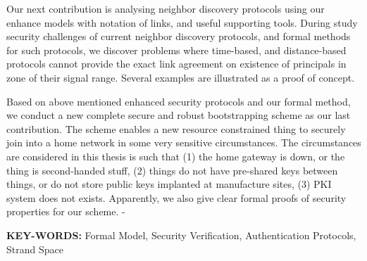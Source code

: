 \documentclass[11pt,a4paper]{book}
\begin{document}
Our next contribution is analysing neighbor discovery protocols using our enhance models with notation of links, and useful supporting tools. During study security challenges of current neighbor discovery protocols, and formal methods for such protocols, we discover problems where time-based, and distance-based protocols cannot provide the exact link agreement on existence of principals in zone of their signal range. Several examples are illustrated as a proof of concept.

Based on above mentioned enhanced security protocols and our formal method, we conduct a new complete secure and robust bootstrapping scheme as our last contribution. The scheme enables a new resource constrained thing to securely join into a home network in some very sensitive circumstances. The circumstances are considered in this thesis is such that (1) the home gateway is down, or the thing is second-handed stuff, (2) things do not have pre-shared keys between things, or do not store public keys implanted at manufacture sites, (3) PKI system does not exists. Apparently, we also give clear formal proofs of security properties for our scheme. -
%

\vspace{.6cm}
{\bf KEY-WORDS: } Formal Model, Security Verification, Authentication Protocols, Strand Space
%
%
%
%


%
%
\end{document}
